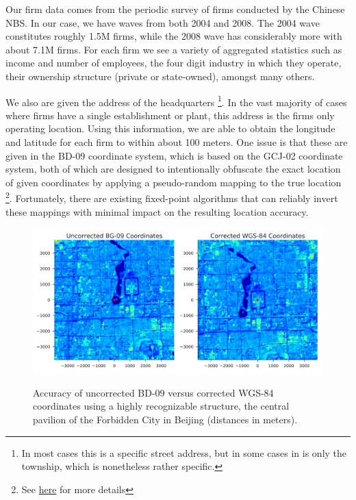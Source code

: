 \documentclass[12pt]{article}
\begin{document}
Our firm data comes from the periodic survey of firms conducted by the Chinese NBS. In our case, we have waves from both 2004 and 2008. The 2004 wave constitutes roughly 1.5M firms, while the 2008 wave has considerably more with about 7.1M firms. For each firm we see a variety of aggregated statistics such as income and number of employees, the four digit industry in which they operate, their ownership structure (private or state-owned), amongst many others.

We also are given the address of the headquarters \footnote{In most cases this is a specific street address, but in some cases in is only the township, which is nonetheless rather specific.}. In the vast majority of cases where firms have a single establishment or plant, this address is the firms only operating location. Using this information, we are able to obtain the longitude and latitude for each firm to within about 100 meters. One issue is that these are given in the BD-09 coordinate system, which is based on the GCJ-02 coordinate system, both of which are designed to intentionally obfuscate the exact location of given coordinates by applying a pseudo-random mapping to the true location \footnote{See \href{https://en.wikipedia.org/wiki/Restrictions\_on\_geographic\_data\_in\_China}{here} for more details}. Fortunately, there are existing fixed-point algorithms that can reliably invert these mappings with minimal impact on the resulting location accuracy.

\begin{figure}
\begin{center}
\label{bd_wgs_compare}
\includegraphics[width=\textwidth]{bd_wgs_compare.pdf}

\caption{Accuracy of uncorrected BD-09 versus corrected WGS-84 coordinates using a highly recognizable structure, the central pavilion of the Forbidden City in Beijing (distances in meters).}
\end{center}
\end{figure}
\end{document}

